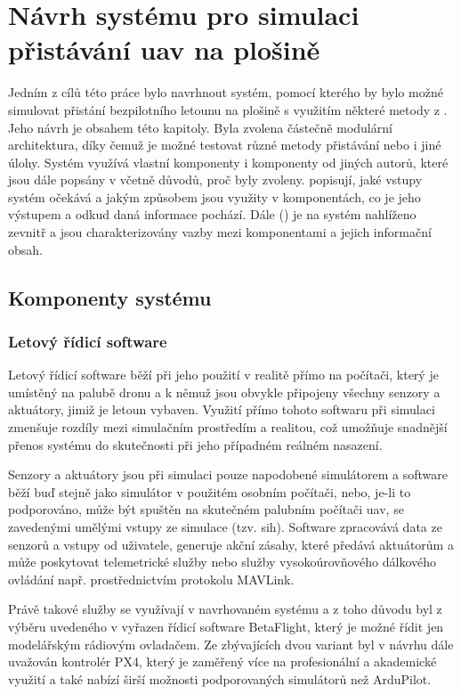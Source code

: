\chapter{Návrh systému pro simulaci přistávání \acrshort{uav} na plošině} \label{chap:system}
  Jedním z cílů této práce bylo navrhnout systém, pomocí kterého by bylo možné simulovat přistání bezpilotního letounu na plošině s využitím některé metody z . Jeho návrh je obsahem této kapitoly. Byla zvolena částečně modulární architektura, díky čemuž je možné testovat různé metody přistávání nebo i jiné úlohy. Systém využívá vlastní komponenty i komponenty od jiných autorů, které jsou dále popsány v  včetně důvodů, proč byly zvoleny.  popisují, jaké vstupy systém očekává a jakým způsobem jsou využity v komponentách, co je jeho výstupem a odkud daná informace pochází. Dále () je na systém nahlíženo zevnitř a jsou charakterizovány vazby mezi komponentami a jejich informační obsah.
  
  \section{Komponenty systému} \label{sec:components}
    \subsection{Letový řídicí software}
      Letový řídicí software běží při jeho použití v realitě přímo na počítači, který je umístěný na palubě dronu a k němuž jsou obvykle připojeny všechny senzory a aktuátory, jimiž je letoun vybaven. Využití přímo tohoto softwaru při simulaci zmenšuje rozdíly mezi simulačním prostředím a realitou, což umožňuje snadnější přenos systému do skutečnosti při jeho případném reálném nasazení.
      
      Senzory a aktuátory jsou při simulaci pouze napodobené simulátorem a software běží buď stejně jako simulátor v použitém osobním počítači, nebo, je-li to podporováno, může být spuštěn na skutečném palubním počítači \acrshort{uav}, se zavedenými umělými vstupy ze simulace (tzv. \acrfull{sih}). Software zpracovává data ze senzorů a vstupy od uživatele, generuje akční zásahy, které předává aktuátorům a může poskytovat telemetrické služby nebo služby vysokoúrovňového dálkového ovládání např. prostřednictvím protokolu MAVLink.
      
      Právě takové služby se využívají v navrhovaném systému a z toho důvodu byl z výběru uvedeného v  vyřazen řídicí software BetaFlight, který je možné řídit jen modelářským rádiovým ovladačem. Ze zbývajících dvou variant byl v návrhu dále uvažován kontrolér PX4, který je zaměřený více na profesionální a akademické využití a také nabízí širší možnosti podporovaných simulátorů než ArduPilot.
